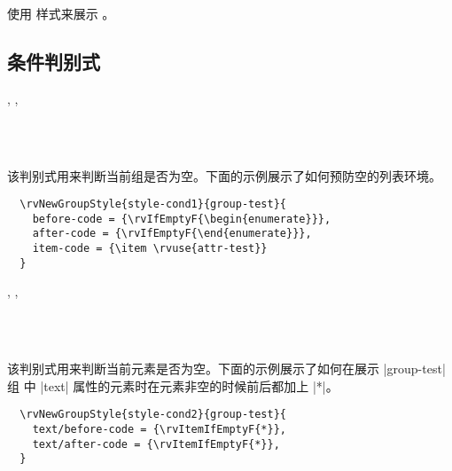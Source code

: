 \documentclass[full]{l3doc}
\begin{document}
\begin{documentation}
\begin{function}{\rvshow}
  \begin{syntax}
      
  \end{syntax}

  使用  样式来展示 。
\end{function}

\subsection{条件判别式}

\begin{function}{\rvIfEmptyT, \rvIfEmptyF, \rvIfEmptyTF}
  \begin{syntax}
       \\
      \\
     
  \end{syntax}

  该判别式用来判断当前组是否为空。下面的示例展示了如何预防空的列表环境。
\end{function}

\begin{verbatim}
  \rvNewGroupStyle{style-cond1}{group-test}{
    before-code = {\rvIfEmptyF{\begin{enumerate}}},
    after-code = {\rvIfEmptyF{\end{enumerate}}},
    item-code = {\item \rvuse{attr-test}}
  }
\end{verbatim}

\begin{function}{\rvItemIfEmptyT, \rvItemIfEmptyF, \rvItemIfEmptyTF}
  \begin{syntax}
       \\
      \\
     
  \end{syntax}

  该判别式用来判断当前元素是否为空。下面的示例展示了如何在展示 |group-test| 组
  中 |text| 属性的元素时在元素非空的时候前后都加上 |*|。
\end{function}

\begin{verbatim}
  \rvNewGroupStyle{style-cond2}{group-test}{
    text/before-code = {\rvItemIfEmptyF{*}},
    text/after-code = {\rvItemIfEmptyF{*}},
  }
\end{verbatim}


\end{documentation}
\end{document}
